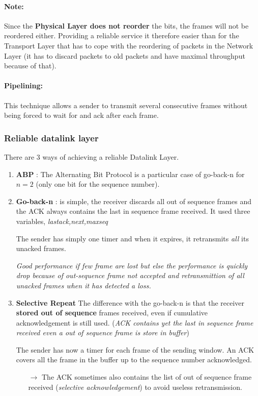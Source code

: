 \paragraph{Note: }
Since the \textbf{Physical Layer does not reorder} the bits,
the frames will not be reordered either.
Providing a reliable service it therefore easier than for the Transport Layer that has to cope with the reordering of packets in the Network Layer (it has to discard packets to old packets and have maximal throughput because of that).

\paragraph{Pipelining:  }  This technique  allows  a  sender to  transmit
several  consecutive frames  without being  forced to  wait for  and ack
after each frame.

\subsubsection{Reliable datalink layer}
There are 3 ways of achieving a reliable Datalink Layer.
\begin{enumerate}
  \item \textbf{ABP} :
    The Alternating Bit Protocol is
    a particular case of go-back-n for $n = 2$ (only one bit for the sequence number).
  \item \textbf{Go-back-n} :
    is simple, the receiver discards all out of sequence frames
    and the ACK always contains the last in sequence frame received. It used three variables,
    \textit{lastack,next,maxseq}

    The sender has simply one timer and when it expires, it retransmits \emph{all}
    its unacked frames.

    \begin{center}
    \textit{Good performance if few frame are lost but else the performance is quickly
    drop because of out-sequence frame not accepted and retransmittion of all
unacked frames when it has detected a loss.}
\end{center}

  \item \textbf{Selective Repeat}
      The difference with the go-back-n is that the receiver \textbf{stored out of sequence} frames received, even if cumulative acknowledgement is still used. (\textit{ACK
      contains yet the last in sequence frame received even a out of sequence
  frame is store in buffer})

    The sender has  now a timer  for each frame  of the
    sending window. An ACK covers all the frame in the buffer up to the sequence number acknowledged.

    \begin{itemize}
        \item[$\to$] The ACK sometimes also contains the list of out of sequence frame received (\emph{selective acknowledgement}) to avoid useless retransmission.
    \end{itemize}
\end{enumerate}

